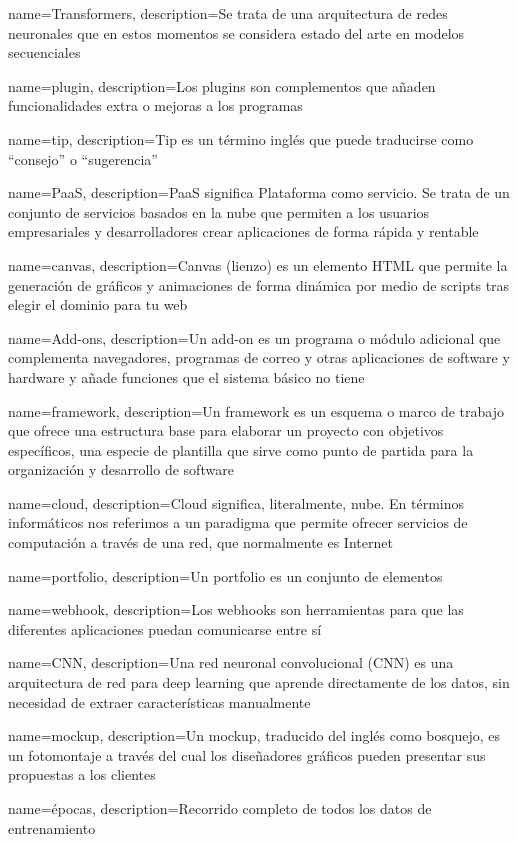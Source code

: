 {
    name=Transformers,
    description={Se trata de una arquitectura de redes neuronales que en estos momentos se considera estado del arte en modelos secuenciales}
}

{
    name=plugin,
    description={Los plugins son complementos que añaden funcionalidades extra o mejoras a los programas}
}

{
    name=tip,
    description={Tip es un término inglés que puede traducirse como “consejo” o “sugerencia”}
}

{
    name=PaaS,
    description={PaaS significa Plataforma como servicio. Se trata de un conjunto de servicios basados en la nube que permiten a los usuarios empresariales y desarrolladores crear aplicaciones de forma rápida y rentable}
}

{
    name=canvas,
    description={Canvas (lienzo) es un elemento HTML que permite la generación de gráficos y animaciones de forma dinámica por medio de scripts tras elegir el dominio para tu web}
}

{
    name=Add-ons,
    description={Un add-on es un programa o módulo adicional que complementa navegadores, programas de correo y otras aplicaciones de software y hardware y añade funciones que el sistema básico no tiene}
}

{
    name=framework,
    description={Un framework es un esquema o marco de trabajo que ofrece una estructura base para elaborar un proyecto con objetivos específicos, una especie de plantilla que sirve como punto de partida para la organización y desarrollo de software}
}

{
    name=cloud,
    description={Cloud significa, literalmente, nube. En términos informáticos nos referimos a un paradigma que permite ofrecer servicios de computación a través de una red, que normalmente es Internet}
}

{
    name=portfolio,
    description={Un portfolio es un conjunto de elementos}
}

{
    name=webhook,
    description={Los webhooks son herramientas para que las diferentes aplicaciones puedan comunicarse entre sí}
}

{
    name=CNN,
    description={Una red neuronal convolucional (CNN) es una arquitectura de red para deep learning que aprende directamente de los datos, sin necesidad de extraer características manualmente}
}

{
    name=mockup,
    description={Un mockup, traducido del inglés como bosquejo, es un fotomontaje a través del cual los diseñadores gráficos pueden presentar sus propuestas a los clientes}
}

{
    name=épocas,
    description={Recorrido completo de todos los datos de entrenamiento}
}
